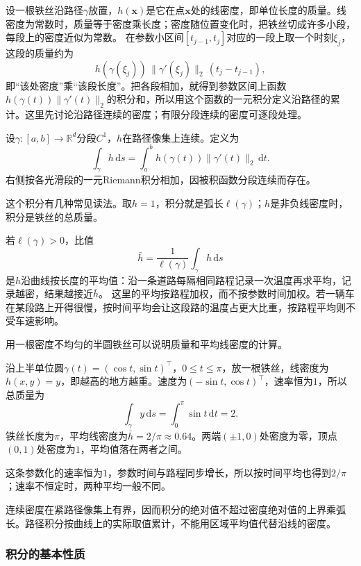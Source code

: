 设一根铁丝沿路径$\gamma$放置，$h(\bm x)$是它在点$\bm x$处的线密度，即单位长度的质量。线密度为常数时，质量等于密度乘长度；密度随位置变化时，把铁丝切成许多小段，每段上的密度近似为常数。
在参数小区间$[t_{j-1},t_j]$对应的一段上取一个时刻$\xi_j$，这段的质量约为
\[
 h(\gamma(\xi_j))\,\lVert\gamma'(\xi_j)\rVert_2\,(t_j-t_{j-1}),
\]
即“该处密度”乘“该段长度”。把各段相加，就得到参数区间上函数$h(\gamma(t))\lVert\gamma'(t)\rVert_2$的积分和，所以用这个函数的一元积分定义沿路径的累计。这里先讨论沿路径连续的密度；有限分段连续的密度可逐段处理。
\begin{definition}[第一类路径积分]
设$\gamma:[a,b]\to\mathbb R^d$分段$C^1$，$h$在路径像集上连续。定义为
\begin{equation}
 \int_\gamma h\,\mathrm ds=\int_a^b h(\gamma(t))\|\gamma'(t)\|_2\,\mathrm dt.
 \label{eq:analysis-scalar-line-integral}
\end{equation}
右侧按各光滑段的一元Riemann积分相加，因被积函数分段连续而存在。
\end{definition}

这个积分有几种常见读法。取$h=1$，积分就是弧长$\ell(\gamma)$；$h$是非负线密度时，积分是铁丝的总质量。

若$\ell(\gamma)>0$，比值
\[
 \bar h=\frac1{\ell(\gamma)}\int_\gamma h\,\mathrm ds
\]
是$h$沿曲线按长度的平均值：沿一条道路每隔相同路程记录一次温度再求平均，记录越密，结果越接近$\bar h$。
这里的平均按路程加权，而不按参数时间加权。若一辆车在某段路上开得很慢，按时间平均会让这段路的温度占更大比重，按路程平均则不受车速影响。

用一根密度不均匀的半圆铁丝可以说明质量和平均线密度的计算。
\begin{example}[上半圆铁丝的质量与平均线密度]
\label{ex:analysis-semicircle-wire}
沿上半单位圆$\gamma(t)=(\cos t,\sin t)^\top$，$0\leq t\leq\pi$，放一根铁丝，线密度为$h(x,y)=y$，即越高的地方越重。速度为$(-\sin t,\cos t)^\top$，速率恒为$1$，所以总质量为
\[
 \int_\gamma y\,\mathrm ds=\int_0^\pi\sin t\,\mathrm dt=2.
\]
铁丝长度为$\pi$，平均线密度为$\bar h=2/\pi\approx0.64$。两端$(\pm1,0)$处密度为零，顶点$(0,1)$处密度为$1$，平均值落在两者之间。
\end{example}
这条参数化的速率恒为$1$，参数时间与路程同步增长，所以按时间平均也得到$2/\pi$；速率不恒定时，两种平均一般不同。

连续密度在紧路径像集上有界，因而积分的绝对值不超过密度绝对值的上界乘弧长。路径积分按曲线上的实际取值累计，不能用区域平均值代替沿线的密度。

\subsubsection{积分的基本性质}

